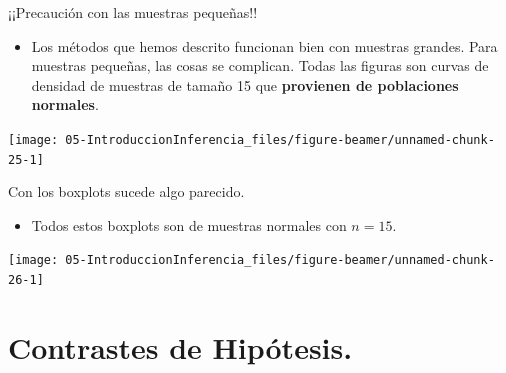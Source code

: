 \documentclass[
  9pt,
  ignorenonframetext,
]{beamer}
\providecommand{\tightlist}{%
  \setlength{\itemsep}{0pt}\setlength{\parskip}{0pt}}
\begin{document}
\begin{frame}{¡¡Precaución con las muestras pequeñas!!}
\protect\hypertarget{precaucion-con-las-muestras-pequenas}{}

\begin{itemize}
\tightlist
\item
  Los métodos que hemos descrito funcionan bien con muestras grandes.
  Para muestras pequeñas, las cosas se complican. Todas las figuras son
  curvas de densidad de muestras de tamaño 15 que \textbf{provienen de
  poblaciones normales}.
\end{itemize}

\begin{center}\texttt{[image: 05-IntroduccionInferencia\_files/figure-beamer/unnamed-chunk-25-1]} \end{center}

\end{frame}

\begin{frame}{Con los boxplots sucede algo parecido.}
\protect\hypertarget{con-los-boxplots-sucede-algo-parecido.}{}

\begin{itemize}
\tightlist
\item
  Todos estos boxplots son de muestras normales con \(n = 15\).
\end{itemize}

\begin{center}\texttt{[image: 05-IntroduccionInferencia\_files/figure-beamer/unnamed-chunk-26-1]} \end{center}

\end{frame}

\hypertarget{contrastes-de-hipotesis.}{%
\section{Contrastes de Hipótesis.}\label{contrastes-de-hipotesis.}}
\end{document}
